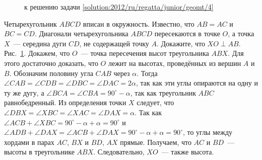 \ifsolution
\begin{figure}\centering
    \caption{к решению задачи \ref{solution:2012/ru/regatta/junior/geomt/4}}
    \label{fig:solution:2012/ru/regatta/junior/geomt/4}
\end{figure}%
\fi %

\problem
Четырехугольник $ABCD$ вписан в окружность.
Известно, что $AB = AC$ и $BC = CD$.
Диагонали четырехугольника $ABCD$ пересекаются в точке $O$, а точка $X$~---
середина дуги $CD$, не содержащей точку $A$. Докажите, что $XO \perp AB$.
\solution
\label{solution:2012/ru/regatta/junior/geomt/4}%
Рис.~\ref{fig:solution:2012/ru/regatta/junior/geomt/4}.
Докажем, что $O$~--- точка пересечения высот треугольника $ABX$.
Для этого достаточно доказать, что $O$ лежит на высотах, проведённых из вершин
$A$ и $B$.
Обозначим половину угла $CAB$ через $\alpha$.
Тогда
$\angle CAB = \angle CDB = \angle DBC = \angle DAC = 2 \alpha$,
так как эти углы опираются на одну и ту же дугу, а
$\angle BCA = \angle CBA = 90^\circ - \alpha$,
так как треугольник $ABC$ равнобедренный.
Из определения точки $X$ следует, что
$\angle DBX = \angle XBC = \angle XAC = \angle DAX = \alpha$.
Так как
\(
    \angle ACB + \angle XBC
=
    90^\circ - \alpha + \alpha
=
    90^\circ
\)
и
\(
    \angle ADB + \angle DAX
=
    \angle ACB + \angle DAX
=
    90^\circ - \alpha + \alpha
=
    90^\circ
\),
то углы между хордами в парах $AC$, $BX$ и $BD$, $AX$ прямые.
Получаем, что $AC$ и $BD$~--- высоты в треугольнике $ABX$.
Следовательно, $XO$~--- также высота.
\endproblem

